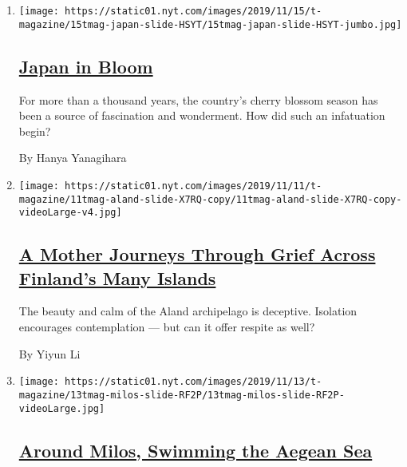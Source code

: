 \begin{enumerate}
\def\labelenumi{\arabic{enumi}.}
\item
  \texttt{[image: https://static01.nyt.com/images/2019/11/15/t-magazine/15tmag-japan-slide-HSYT/15tmag-japan-slide-HSYT-jumbo.jpg]}

  \hypertarget{japan-in-bloom}{%
  \subsection{\texorpdfstring{\href{/2019/11/15/t-magazine/japan-cherry-blossoms.html}{Japan
  in Bloom}}{Japan in Bloom}}\label{japan-in-bloom}}

  For more than a thousand years, the country's cherry blossom season
  has been a source of fascination and wonderment. How did such an
  infatuation begin?

  By Hanya Yanagihara
\item
  \texttt{[image: https://static01.nyt.com/images/2019/11/11/t-magazine/11tmag-aland-slide-X7RQ-copy/11tmag-aland-slide-X7RQ-copy-videoLarge-v4.jpg]}

  \hypertarget{a-mother-journeys-through-grief-across-finlands-many-islands}{%
  \subsection{\texorpdfstring{\href{/2019/11/12/t-magazine/mother-loses-son-travel-coping.html}{A
  Mother Journeys Through Grief Across Finland's Many
  Islands}}{A Mother Journeys Through Grief Across Finland's Many Islands}}\label{a-mother-journeys-through-grief-across-finlands-many-islands}}

  The beauty and calm of the Aland archipelago is deceptive. Isolation
  encourages contemplation --- but can it offer respite as well?

  By Yiyun Li
\item
  \texttt{[image: https://static01.nyt.com/images/2019/11/13/t-magazine/13tmag-milos-slide-RF2P/13tmag-milos-slide-RF2P-videoLarge.jpg]}

  \hypertarget{around-milos-swimming-the-aegean-sea}{%
  \subsection{\texorpdfstring{\href{/2019/11/14/t-magazine/milos-greece-swimming.html}{Around
  Milos, Swimming the Aegean
  Sea}}{Around Milos, Swimming the Aegean Sea}}\label{around-milos-swimming-the-aegean-sea}}


\end{enumerate}
